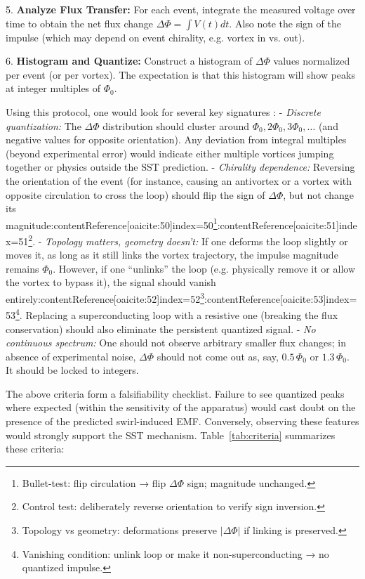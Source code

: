 \documentclass[12pt]{article}
\begin{document}
        5. \textbf{Analyze Flux Transfer:} For each event, integrate the measured voltage over time to obtain the net flux change $\Delta\Phi = \int V(t) dt$. Also note the sign of the impulse (which may depend on event chirality, e.g. vortex in vs. out).

        6. \textbf{Histogram and Quantize:} Construct a histogram of $\Delta\Phi$ values normalized per event (or per vortex). The expectation is that this histogram will show peaks at integer multiples of $\Phi_{0}$.

        Using this protocol, one would look for several key signatures \cite{Iskandarani2025FluxComp}:
        - \emph{Discrete quantization:} The $\Delta\Phi$ distribution should cluster around $\Phi_{0}, 2\Phi_{0}, 3\Phi_{0},\dots$ (and negative values for opposite orientation). Any deviation from integral multiples (beyond experimental error) would indicate either multiple vortices jumping together or physics outside the SST prediction.
        - \emph{Chirality dependence:} Reversing the orientation of the event (for instance, causing an antivortex or a vortex with opposite circulation to cross the loop) should flip the sign of $\Delta\Phi$, but not change its magnitude:contentReference[oaicite:50]{index=50}\footnote{Bullet-test: flip circulation → flip $\Delta\Phi$ sign; magnitude unchanged.}:contentReference[oaicite:51]{index=51}\footnote{Control test: deliberately reverse orientation to verify sign inversion.}.
        - \emph{Topology matters, geometry doesn't:} If one deforms the loop slightly or moves it, as long as it still links the vortex trajectory, the impulse magnitude remains $\Phi_{0}$. However, if one ``unlinks'' the loop (e.g. physically remove it or allow the vortex to bypass it), the signal should vanish entirely:contentReference[oaicite:52]{index=52}\footnote{Topology vs geometry: deformations preserve $|\Delta\Phi|$ if linking is preserved.}:contentReference[oaicite:53]{index=53}\footnote{Vanishing condition: unlink loop or make it non-superconducting → no quantized impulse.}. Replacing a superconducting loop with a resistive one (breaking the flux conservation) should also eliminate the persistent quantized signal.
        - \emph{No continuous spectrum:} One should not observe arbitrary smaller flux changes; in absence of experimental noise, $\Delta\Phi$ should not come out as, say, $0.5\,\Phi_{0}$ or $1.3\,\Phi_{0}$. It should be locked to integers.

        The above criteria form a falsifiability checklist. Failure to see quantized peaks where expected (within the sensitivity of the apparatus) would cast doubt on the presence of the predicted swirl-induced EMF. Conversely, observing these features would strongly support the SST mechanism. Table~\ref{tab:criteria} summarizes these criteria:
\end{document}
